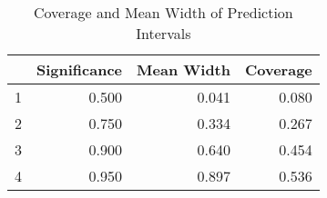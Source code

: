 \begin{table}[ht]
\centering
\begin{tabular}{rrrr}
  \toprule
 & Significance & Mean Width & Coverage \\ 
  \midrule
1 & 0.500 & 0.041 & 0.080 \\ 
  2 & 0.750 & 0.334 & 0.267 \\ 
  3 & 0.900 & 0.640 & 0.454 \\ 
  4 & 0.950 & 0.897 & 0.536 \\ 
   \bottomrule
\end{tabular}
\caption{Coverage and Mean Width of Prediction Intervals} 
\end{table}

